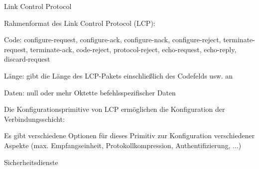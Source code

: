 \documentclass[a4paper]{article}
\begin{document}
\begin{multicols}{3}
      Link Control Protocol

      \begin{itemize*}
            \item Rahmenformat des Link Control Protocol (LCP):
            \begin{itemize*}
                  \item Code: configure-request, configure-ack, configure-nack, configure-reject, terminate-request, terminate-ack, code-reject, protocol-reject, echo-request, echo-reply, discard-request
                  \item Länge: gibt die Länge des LCP-Pakets einschließlich des Codefelds usw. an
                  \item Daten: null oder mehr Oktette befehlsspezifischer Daten
            \end{itemize*}
            \item Die Konfigurationsprimitive von LCP ermöglichen die Konfiguration der
            Verbindungsschicht:
            \begin{itemize*}
                  \item Es gibt verschiedene Optionen für dieses Primitiv zur Konfiguration verschiedener Aspekte (max. Empfangseinheit, Protokollkompression, Authentifizierung, ...)
            \end{itemize*}
      \end{itemize*}

      Sicherheitsdienste


\end{multicols}
\end{document}
